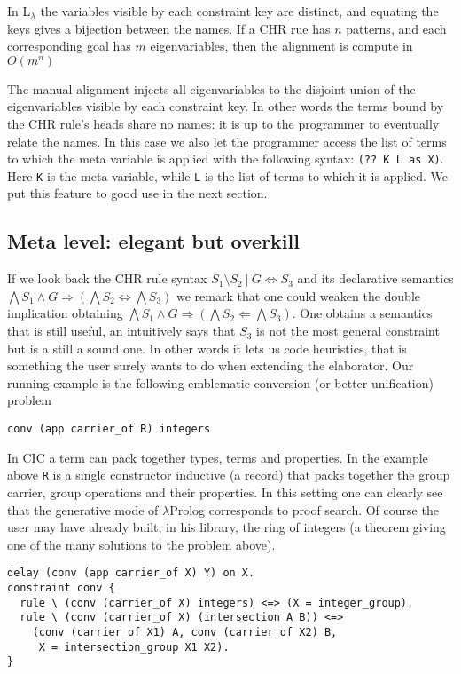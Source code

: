\documentclass{easychair}
\begin{document}
In L$_\lambda$ the variables visible by each constraint key are distinct,
and equating the keys gives a bijection between the names.
If a CHR rue has $n$ patterns, and each corresponding goal has $m$
eigenvariables, then the alignment is compute in $O(m^n)$

The manual alignment injects all eigenvariables to the disjoint union
of the eigenvariables visible by each constraint key.  In other words
the terms bound by the CHR rule's heads share no names: it is
up to the programmer to eventually relate the names.
In this case we also let the programmer access the list of terms
to which the meta variable is applied with the following syntax:
\verb+(?? K L as X)+.  Here \verb+K+ is the meta variable, while
\verb+L+ is the list of terms to which it is applied.  We put this
feature to good use in the next section.

\subsection{Meta level: elegant but overkill}

If we look back the CHR rule syntax
$S_1 \setminus S_2 ~|~ G \iff S_3$ and its
declarative semantics $\bigwedge S_1 \wedge G \Rightarrow (\bigwedge
S_2 \iff \bigwedge S_3)$ we remark that one could
weaken the double implication obtaining
 $\bigwedge S_1 \wedge G \Rightarrow (\bigwedge
S_2 \Leftarrow \bigwedge S_3)$.  One obtains a semantics that
is still useful, an intuitively says that $S_3$ is not the most general
constraint but is a still a sound one.  In other words it lets
us code heuristics, that is something the user surely wants to
do when extending the elaborator.  Our running example
is the following emblematic conversion (or better unification) problem

\begin{Verbatim}
conv (app carrier_of R) integers
\end{Verbatim}

In CIC a term can pack together types, terms and properties.  In the
example above \verb+R+ is a single constructor inductive (a record)
that packs together the group carrier, group operations and their properties.
In this setting one can clearly see that the generative mode of $\lambda$Prolog corresponds to proof search.  Of course the user may have already built,
in his library, the ring of integers (a theorem giving one of the many
solutions to the problem above).

\begin{Verbatim}
delay (conv (app carrier_of X) Y) on X.
constraint conv {
  rule \ (conv (carrier_of X) integers) <=> (X = integer_group).
  rule \ (conv (carrier_of X) (intersection A B)) <=>
    (conv (carrier_of X1) A, conv (carrier_of X2) B,
     X = intersection_group X1 X2).
}
\end{Verbatim}
\end{document}
